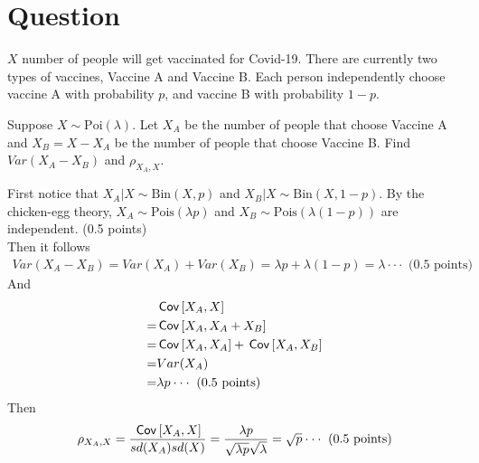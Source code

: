 \section*{Question}
$X$ number of people will get vaccinated for Covid-19. There are currently two types of vaccines, Vaccine A and Vaccine B. Each person independently choose vaccine A with probability $p$, and vaccine B with probability $1-p.$
\begin{exercise}[2]
 Suppose $X\sim\text{Poi}(\lambda).$ Let $X_A$ be the number of people that choose Vaccine A and $X_B=X-X_A$ be the number of people that choose Vaccine B. Find $Var(X_A-X_B)$ and $\rho_{X_A,X}.$

\begin{solution}
First notice that $X_A|X \sim \text{Bin}(X, p)$ and $X_B |X \sim \text{Bin}(X, 1-p)$. By the chicken-egg theory, $X_A\sim\text{Pois}(\lambda p)$ and $X_B \sim \text{Pois}(\lambda (1-p))$ are independent. (0.5 points)\\
Then it follows
\begin{align*}
    Var(X_A-X_B)=Var(X_A)+Var(X_B)=\lambda p+\lambda(1-p)=\lambda  \cdot \cdot \cdot \text{ (0.5 points)}
\end{align*}
And
\begin{align*}
    &\,\mathsf{Cov}\left[X_A,X\right]\\
    =&\,\mathsf{Cov}\left[X_A,X_A+X_B\right]\\
    =&\,\mathsf{Cov}\left[X_A,X_A\right]+\,\mathsf{Cov}\left[X_A,X_B\right]\\
    =&Var(X_A)\\
    =&\lambda p  \cdot \cdot \cdot \text{ (0.5 points)}\\
\end{align*}
Then $$  \rho_{X_A,X}
    =\frac{\,\mathsf{Cov}\left[X_A,X\right]}{sd(X_A)sd(X)}
    =\frac{\lambda p}{\sqrt{\lambda p}\sqrt{\lambda}}
    =\sqrt{p}\cdot \cdot \cdot \text{ (0.5 points)}$$
\end{solution}
\end{exercise}

